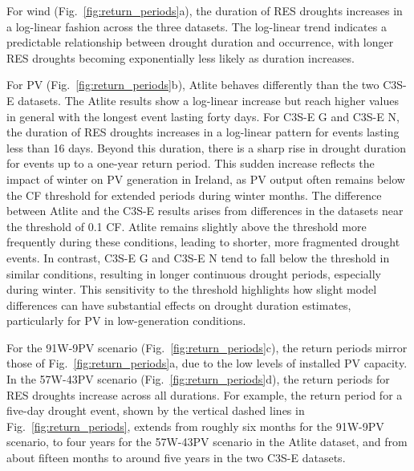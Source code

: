 \documentclass[a4paper, 11p1t]{article}
\begin{document}
For wind (Fig.~\ref{fig:return_periods}a), the duration of RES droughts increases in a log-linear fashion across the three datasets. The log-linear trend indicates a predictable relationship between drought duration and occurrence, with longer RES droughts becoming exponentially less likely as duration increases. 

For PV (Fig.~\ref{fig:return_periods}b), Atlite behaves differently than the two C3S-E datasets. The Atlite results show a log-linear increase but reach higher values in general with the longest event lasting forty days. For C3S-E G and C3S-E N, the duration of RES droughts increases in a log-linear pattern for events lasting less than 16 days. Beyond this duration, there is a sharp rise in drought duration for events up to a one-year return period. This sudden increase reflects the impact of winter on PV generation in Ireland, as PV output often remains below the CF threshold for extended periods during winter months. The difference between Atlite and the C3S-E results arises from differences in the datasets near the threshold of 0.1 CF. Atlite remains slightly above the threshold more frequently during these conditions, leading to shorter, more fragmented drought events. In contrast, C3S-E G and C3S-E N tend to fall below the threshold in similar conditions, resulting in longer continuous drought periods, especially during winter. This sensitivity to the threshold highlights how slight model differences can have substantial effects on drought duration estimates, particularly for PV in low-generation conditions.

For the 91W-9PV scenario (Fig.~\ref{fig:return_periods}c), the return periods mirror those of Fig.~\ref{fig:return_periods}a, due to the low levels of installed PV capacity. In the 57W-43PV scenario (Fig.~\ref{fig:return_periods}d), the return periods for RES droughts increase across all durations. For example, the return period for a five-day drought event, shown by the vertical dashed lines in Fig.~\ref{fig:return_periods}, extends from roughly six months for the 91W-9PV scenario, to four years for the 57W-43PV scenario in the Atlite dataset, and from about fifteen months to around five years in the two C3S-E datasets.
\end{document}
